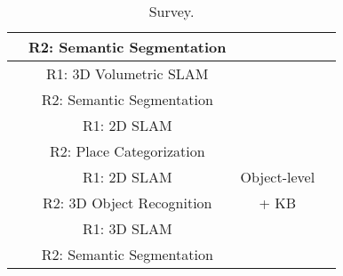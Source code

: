 \documentclass[a4paper,landscape]{article}
\begin{document}
\begin{table}
{\begin{tabular}{|l|c|c|c|}
			& R2: Semantic Segmentation & & \\
			\hline
			\multirow{2}{*}{\cite{vineet2015icra}}& R1: 3D Volumetric SLAM & & \\ 
			& R2: Semantic Segmentation & & \\
			\hline
			\multirow{2}{*}{\cite{sunderhauf2016icra}}& R1: 2D SLAM & & \\ 
			& R2: Place Categorization & & \\
			\hline
			\multirow{2}{*}{\cite{ruiz2017building}}& R1: 2D SLAM & Object-level& \\ 
			& R2: 3D Object Recognition & + KB & \\
			\hline
			\multirow{2}{*}{\cite{mccormac2017semanticfusion}}& R1: 3D SLAM & & \\ 
			& R2: Semantic Segmentation & & \\
			\hline 			 
		\end{tabular}}
		\caption{Survey.}
		\label{tab:survey}
	\end{table}
	
	\clearpage

	
	
	
\end{document}
